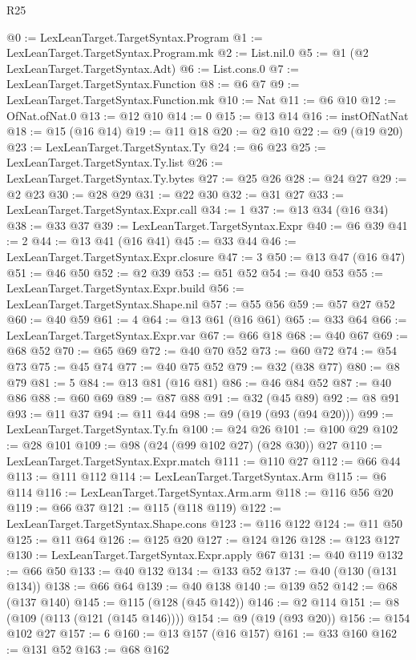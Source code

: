 \begin{lexlean}{R25}
\begin{coremodule}
{{{{{{{{{{{{{{{{{{{{{{{{{{{{{{{{{{{{{{{{{{{{{{{{{{{{{@0 := LexLeanTarget.TargetSyntax.Program
@1 := LexLeanTarget.TargetSyntax.Program.mk
@2 := List.nil.{0}
@5 := @1 (@2 LexLeanTarget.TargetSyntax.Adt)
@6 := List.cons.{0}
@7 := LexLeanTarget.TargetSyntax.Function
@8 := @6 @7
@9 := LexLeanTarget.TargetSyntax.Function.mk
@10 := Nat
@11 := @6 @10
@12 := OfNat.ofNat.{0}
@13 := @12 @10
@14 := 0
@15 := @13 @14
@16 := instOfNatNat
@18 := @15 (@16 @14)
@19 := @11 @18
@20 := @2 @10
@22 := @9 (@19 @20)
@23 := LexLeanTarget.TargetSyntax.Ty
@24 := @6 @23
@25 := LexLeanTarget.TargetSyntax.Ty.list
@26 := LexLeanTarget.TargetSyntax.Ty.bytes
@27 := @25 @26
@28 := @24 @27
@29 := @2 @23
@30 := @28 @29
@31 := @22 @30
@32 := @31 @27
@33 := LexLeanTarget.TargetSyntax.Expr.call
@34 := 1
@37 := @13 @34 (@16 @34)
@38 := @33 @37
@39 := LexLeanTarget.TargetSyntax.Expr
@40 := @6 @39
@41 := 2
@44 := @13 @41 (@16 @41)
@45 := @33 @44
@46 := LexLeanTarget.TargetSyntax.Expr.closure
@47 := 3
@50 := @13 @47 (@16 @47)
@51 := @46 @50
@52 := @2 @39
@53 := @51 @52
@54 := @40 @53
@55 := LexLeanTarget.TargetSyntax.Expr.build
@56 := LexLeanTarget.TargetSyntax.Shape.nil
@57 := @55 @56
@59 := @57 @27 @52
@60 := @40 @59
@61 := 4
@64 := @13 @61 (@16 @61)
@65 := @33 @64
@66 := LexLeanTarget.TargetSyntax.Expr.var
@67 := @66 @18
@68 := @40 @67
@69 := @68 @52
@70 := @65 @69
@72 := @40 @70 @52
@73 := @60 @72
@74 := @54 @73
@75 := @45 @74
@77 := @40 @75 @52
@79 := @32 (@38 @77)
@80 := @8 @79
@81 := 5
@84 := @13 @81 (@16 @81)
@86 := @46 @84 @52
@87 := @40 @86
@88 := @60 @69
@89 := @87 @88
@91 := @32 (@45 @89)
@92 := @8 @91
@93 := @11 @37
@94 := @11 @44
@98 := @9 (@19 (@93 (@94 @20)))
@99 := LexLeanTarget.TargetSyntax.Ty.fn
@100 := @24 @26
@101 := @100 @29
@102 := @28 @101
@109 := @98 (@24 (@99 @102 @27) (@28 @30)) @27
@110 := LexLeanTarget.TargetSyntax.Expr.match
@111 := @110 @27
@112 := @66 @44
@113 := @111 @112
@114 := LexLeanTarget.TargetSyntax.Arm
@115 := @6 @114
@116 := LexLeanTarget.TargetSyntax.Arm.arm
@118 := @116 @56 @20
@119 := @66 @37
@121 := @115 (@118 @119)
@122 := LexLeanTarget.TargetSyntax.Shape.cons
@123 := @116 @122
@124 := @11 @50
@125 := @11 @64
@126 := @125 @20
@127 := @124 @126
@128 := @123 @127
@130 := LexLeanTarget.TargetSyntax.Expr.apply @67
@131 := @40 @119
@132 := @66 @50
@133 := @40 @132
@134 := @133 @52
@137 := @40 (@130 (@131 @134))
@138 := @66 @64
@139 := @40 @138
@140 := @139 @52
@142 := @68 (@137 @140)
@145 := @115 (@128 (@45 @142))
@146 := @2 @114
@151 := @8 (@109 (@113 (@121 (@145 @146))))
@154 := @9 (@19 (@93 @20))
@156 := @154 @102 @27
@157 := 6
@160 := @13 @157 (@16 @157)
@161 := @33 @160
@162 := @131 @52
@163 := @68 @162
}}}}}}}}}}}}}}}}}}}}}}}}}}}}}}}}}}}}}}}}}}}}}}}}}}}}}
\end{coremodule}
\end{lexlean}
